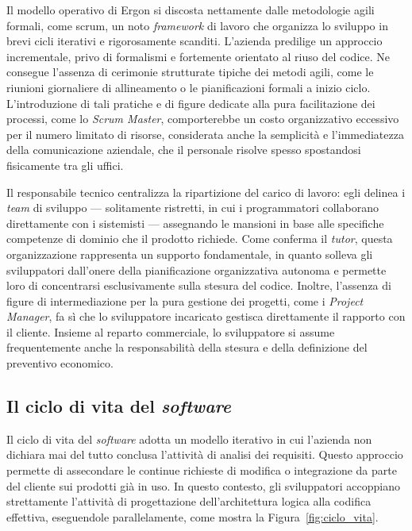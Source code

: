 Il modello operativo di Ergon si discosta nettamente dalle metodologie agili formali, come \gls{scrum}, un noto \textit{framework} di lavoro che organizza lo sviluppo in brevi cicli iterativi e rigorosamente scanditi. L'azienda predilige un approccio incrementale, privo di formalismi e fortemente orientato al riuso del codice. Ne consegue l'assenza di cerimonie strutturate tipiche dei metodi agili, come le riunioni giornaliere di allineamento o le pianificazioni formali a inizio ciclo. L'introduzione di tali pratiche e di figure dedicate alla pura facilitazione dei processi, come lo \textit{Scrum Master}, comporterebbe un costo organizzativo eccessivo per il numero limitato di risorse, considerata anche la semplicità e l'immediatezza della comunicazione aziendale, che il personale risolve spesso spostandosi fisicamente tra gli uffici.

Il responsabile tecnico centralizza la ripartizione del carico di lavoro: egli delinea i \textit{team} di sviluppo --- solitamente ristretti, in cui i programmatori collaborano direttamente con i sistemisti --- assegnando le mansioni in base alle specifiche competenze di dominio che il prodotto richiede. Come conferma il \textit{tutor}, questa organizzazione rappresenta un supporto fondamentale, in quanto solleva gli sviluppatori dall'onere della pianificazione organizzativa autonoma e permette loro di concentrarsi esclusivamente sulla stesura del codice. Inoltre, l'assenza di figure di intermediazione per la pura gestione dei progetti, come i \textit{Project Manager}, fa sì che lo sviluppatore incaricato gestisca direttamente il rapporto con il cliente. Insieme al reparto commerciale, lo sviluppatore si assume frequentemente anche la responsabilità della stesura e della definizione del preventivo economico.

\subsection{Il ciclo di vita del \textit{software}}

Il ciclo di vita del \textit{software} adotta un modello iterativo in cui l'azienda non dichiara mai del tutto conclusa l'attività di analisi dei requisiti. Questo approccio permette di assecondare le continue richieste di modifica o integrazione da parte del cliente sui prodotti già in uso. In questo contesto, gli sviluppatori accoppiano strettamente l'attività di progettazione dell'architettura logica alla codifica effettiva, eseguendole parallelamente, come mostra la Figura~\ref{fig:ciclo_vita}.

